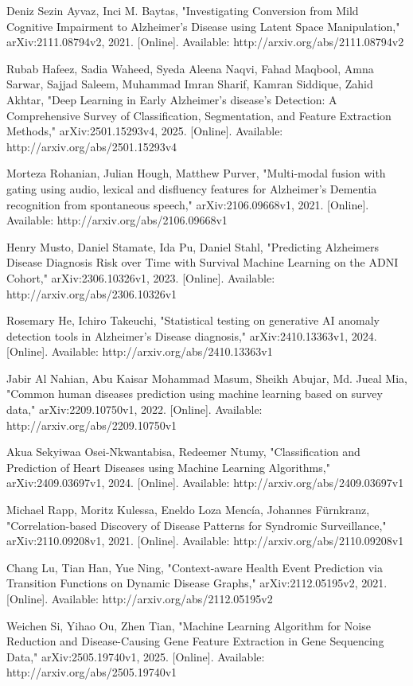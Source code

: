 \documentclass[conference]{IEEEtran}
\begin{document}
\begin{thebibliography}{99}
 Deniz Sezin Ayvaz, Inci M. Baytas, "Investigating Conversion from Mild Cognitive Impairment to Alzheimer's Disease using Latent Space Manipulation," arXiv:2111.08794v2, 2021. [Online]. Available: http://arxiv.org/abs/2111.08794v2

 Rubab Hafeez, Sadia Waheed, Syeda Aleena Naqvi, Fahad Maqbool, Amna Sarwar, Sajjad Saleem, Muhammad Imran Sharif, Kamran Siddique, Zahid Akhtar, "Deep Learning in Early Alzheimer's disease's Detection: A Comprehensive Survey of Classification, Segmentation, and Feature Extraction Methods," arXiv:2501.15293v4, 2025. [Online]. Available: http://arxiv.org/abs/2501.15293v4

 Morteza Rohanian, Julian Hough, Matthew Purver, "Multi-modal fusion with gating using audio, lexical and disfluency features for Alzheimer's Dementia recognition from spontaneous speech," arXiv:2106.09668v1, 2021. [Online]. Available: http://arxiv.org/abs/2106.09668v1

 Henry Musto, Daniel Stamate, Ida Pu, Daniel Stahl, "Predicting Alzheimers Disease Diagnosis Risk over Time with Survival Machine Learning on the ADNI Cohort," arXiv:2306.10326v1, 2023. [Online]. Available: http://arxiv.org/abs/2306.10326v1

 Rosemary He, Ichiro Takeuchi, "Statistical testing on generative AI anomaly detection tools in Alzheimer's Disease diagnosis," arXiv:2410.13363v1, 2024. [Online]. Available: http://arxiv.org/abs/2410.13363v1

 Jabir Al Nahian, Abu Kaisar Mohammad Masum, Sheikh Abujar, Md. Jueal Mia, "Common human diseases prediction using machine learning based on survey data," arXiv:2209.10750v1, 2022. [Online]. Available: http://arxiv.org/abs/2209.10750v1

 Akua Sekyiwaa Osei-Nkwantabisa, Redeemer Ntumy, "Classification and Prediction of Heart Diseases using Machine Learning Algorithms," arXiv:2409.03697v1, 2024. [Online]. Available: http://arxiv.org/abs/2409.03697v1

 Michael Rapp, Moritz Kulessa, Eneldo Loza Mencía, Johannes Fürnkranz, "Correlation-based Discovery of Disease Patterns for Syndromic Surveillance," arXiv:2110.09208v1, 2021. [Online]. Available: http://arxiv.org/abs/2110.09208v1

 Chang Lu, Tian Han, Yue Ning, "Context-aware Health Event Prediction via Transition Functions on Dynamic Disease Graphs," arXiv:2112.05195v2, 2021. [Online]. Available: http://arxiv.org/abs/2112.05195v2

 Weichen Si, Yihao Ou, Zhen Tian, "Machine Learning Algorithm for Noise Reduction and Disease-Causing Gene Feature Extraction in Gene Sequencing Data," arXiv:2505.19740v1, 2025. [Online]. Available: http://arxiv.org/abs/2505.19740v1


\end{thebibliography}
\end{document}
